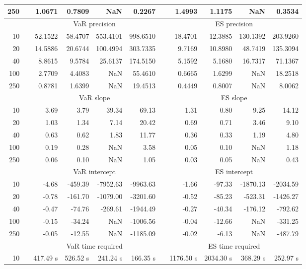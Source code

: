 {{\begin{longtable}{rr rrrr r rrrr}
250 && 1.0671  & 0.7809  &    NaN & 0.2267 && 1.4993  & 1.1175  &    NaN & 0.3534 \\ 
\hline 
 & & \multicolumn{4}{c}{VaR precision} &&  \multicolumn{4}{c}{ES precision} \\ \cline{3-6}  \cline{8-11}
10 && 52.1522 & 58.4707 & 553.4101 & 998.6510 & & 18.4701 & 12.3885 & 130.1392 & 203.9260 \\ 
20 && 14.5886 & 20.6744 & 100.4994 & 303.7335 & & 9.7169 & 10.8980 & 48.7419 & 135.3094 \\ 
40 && 8.8615 & 9.5784 & 25.6137 & 174.5150 & & 5.1592 & 5.1680 & 16.7317 & 71.1367 \\ 
100 && 2.7709 & 4.4083 &    NaN & 55.4610 & & 0.6665 & 1.6299 &    NaN & 18.2518 \\ 
250 && 0.8781 & 1.6399 &    NaN & 19.4513 & & 0.4449 & 0.8007 &    NaN & 8.0062 \\ 
\hline 
 & & \multicolumn{4}{c}{ VaR slope} && \multicolumn{4}{c}{ES slope} \\ \cline{3-6}  \cline{8-11}
10 && 3.69 & 3.79 & 39.34 & 69.13 && 1.31 & 0.80 & 9.25 & 14.12 \\ 
20 && 1.03 & 1.34 & 7.14 & 20.42 && 0.69 & 0.71 & 3.46 & 9.10 \\ 
40 && 0.63 & 0.62 & 1.83 & 11.77 && 0.36 & 0.33 & 1.19 & 4.80 \\ 
100 && 0.19 & 0.28 &  NaN & 3.58 && 0.05 & 0.10 &  NaN & 1.18 \\ 
250 && 0.06 & 0.10 &  NaN & 1.05 && 0.03 & 0.05 &  NaN & 0.43 \\ 
\hline 
 & & \multicolumn{4}{c}{ VaR intercept} &&  \multicolumn{4}{c}{ES intercept} \\ \cline{3-6}  \cline{8-11}
10 && -4.68 & -459.39 & -7952.63 & -9963.63 && -1.66 & -97.33 & -1870.13 & -2034.59 \\ 
20 && -0.78 & -161.70 & -1079.00 & -3201.60 && -0.52 & -85.23 & -523.31 & -1426.27 \\ 
40 && -0.47 & -74.76 & -269.61 & -1944.49 && -0.27 & -40.34 & -176.12 & -792.62 \\ 
100 && -0.15 & -34.24 &  NaN & -1006.56 && -0.04 & -12.66 &  NaN & -331.25 \\ 
250 && -0.05 & -12.55 &  NaN & -1185.09 && -0.02 & -6.13 &  NaN & -487.79 \\ 
\hline 
 & & \multicolumn{4}{c}{VaR time required} && \multicolumn{4}{c}{ES time required} \\ \cline{3-6}  \cline{8-11}
10 & & 417.49 s & 526.52 s & 241.24 s & 166.35 s && 1176.50 s & 2034.30 s & 368.29 s & 252.97 s \\ 

\end{longtable}}}
